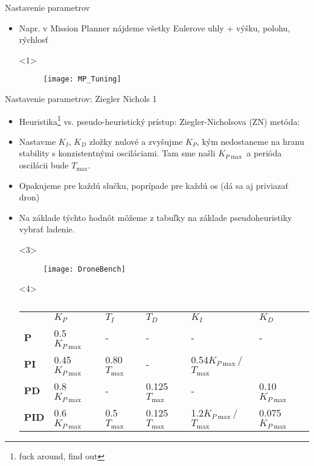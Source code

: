 \begin{frame}[t]{Nastavenie parametrov}
\begin{itemize}
  \item<1-> Napr. v Mission Planner nájdeme všetky Eulerove uhly + výšku, polohu, rýchlosť

  \begin{onlyenv}<1>
  \begin{figure}
\centering
  \texttt{[image: MP\_Tuning]}\\
\end{figure}
\end{onlyenv}
\end{itemize}


\end{frame}

\begin{frame}[t]{Nastavenie parametrov: Ziegler Nichols 1}
\begin{itemize}
  \item<1-> Heuristika\footnote{fuck around, find out} vs.  pseudo-heuristický prístup: Ziegler-Nicholsova (ZN) metóda: \citep{Ziegler1942}
  \item<2-> Nastavme $K_I$, $K_D$ zložky nulové a zvyšujme $K_P$, kým nedostaneme na hranu stability s konzistentnými osciláciami. Tam sme našli $K_{P\max}$ a perióda oscilácii bude $T_{\max}$.
  \item<3-> Opakujeme pre každú slučku, poprípade pre každú os (dá sa aj priviazať dron)
  \item<4-> Na základe týchto hodnôt môžeme z tabuľky na základe pseudoheuristiky vybrať ladenie.

  \begin{onlyenv}<3>
  \begin{figure}
\centering
  \texttt{[image: DroneBench]}\\
\end{figure}
\end{onlyenv}

  \begin{onlyenv}<4>
\begin{table}[]
\caption{}
\label{tab:my-table}
\footnotesize
\begin{tabular}{llllll}
 & $K_P$     & $T_I$     & $T_D$      & $K_I$        & $K_D$     \\
\textbf{P }  & 0.5$K_{P\max}$  & -       &  -       &    -       &  -       \\
\textbf{PI } & 0.45$K_{P\max}$ & 0.80$T_{\max}$ &-         & 0.54$K_{P\max}$/$T_{\max}$ &         \\
\textbf{PD}  & 0.8$K_{P\max}$  &  -      & 0.125$T_{\max}$ &  -         & 0.10$K_{P\max}$  \\
\textbf{PID} & 0.6$K_{P\max}$  & 0.5$T_{\max}$  & 0.125$T_{\max}$ & 1.2$K_{P\max}$/$T_{\max}$  & 0.075$K_{P\max}$
\end{tabular}
\end{table}
\end{onlyenv}


\end{itemize}


\end{frame}

